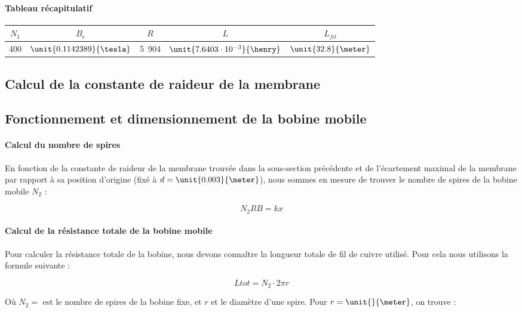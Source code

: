 \paragraph{Tableau récapitulatif}

\begin{center}
	\begin{tabular}{c|c|c|c|c}
		$N_1$ & $B_e$ & $R$ & $L$ & $L_{fil}$ \\
		\hline
		400 & $\unit{0.1142389}{\tesla}$ & \unit{5.904}{\ohm} & $\unit{7.6403 \cdot 10^{-3}}{\henry}$ & $\unit{32.8}{\meter}$\\
	\end{tabular}
\end{center}

\subsection{Calcul de la constante de raideur de la membrane}

\subsection{Fonctionnement et dimensionnement de la bobine mobile}

\paragraph{Calcul du nombre de spires}
En fonction de la constante de raideur de la membrane trouvée dans la sous-section précédente et de l'écartement
maximal de la membrane par rapport à sa position d'origine (fixé à $d = \unit{0.003}{\meter}$), nous sommes en
mesure de trouver le nombre de spires de la bobine mobile $N_2$ :

$$N_2IlB = kx$$


\paragraph{Calcul de la résistance totale de la bobine mobile}
Pour calculer la résistance totale de la bobine, nous devons connaître la longueur totale de fil de cuivre utilisé.
Pour cela nous utilisons la formule suivante :

$$L{tot} = N_2 \cdot 2\pi r$$

Où $N_2 = $ est le nombre de spires de la bobine fixe, et $r$ et le diamètre d'une spire. Pour
$r = \unit{}{\meter}$, on trouve :


